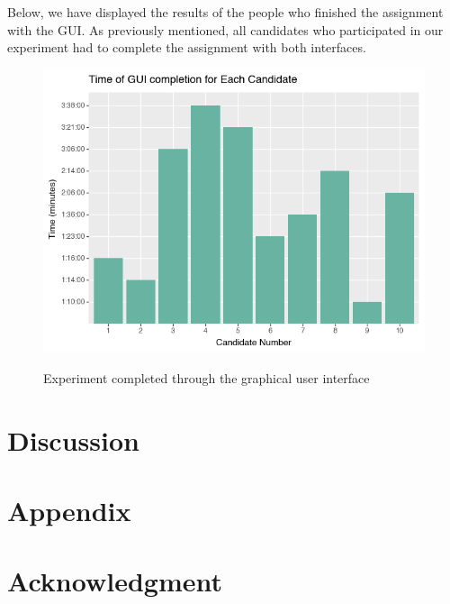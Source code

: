 \documentclass[]{report}
\begin{document}
Below, we have displayed the results of the people who finished the assignment with the GUI. As previously mentioned, all candidates who participated in our experiment had to complete the assignment with both interfaces.
\begin{figure}[H]
	\centering
	\includegraphics[width=0.75\linewidth]{ExperimentGui}\\
	\caption{Experiment completed through the graphical user interface}
	\label{fig: 21}
\end{figure}

	\newpage
	\section{Discussion}
	\section{Appendix}
	\section{Acknowledgment}


\printbibliography[title=References]
\end{document}
